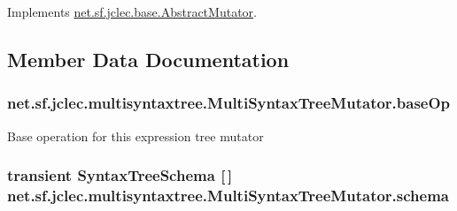 Implements \hyperlink{classnet_1_1sf_1_1jclec_1_1base_1_1_abstract_mutator_ad12e6a2be8fb6082255ce8f399c9b166}{net.\-sf.\-jclec.\-base.\-Abstract\-Mutator}.



\subsection{Member Data Documentation}
\hypertarget{classnet_1_1sf_1_1jclec_1_1multisyntaxtree_1_1_multi_syntax_tree_mutator_a80f98be790fb43998e0937ad1bbf4ec4}{
\subsubsection[{base\-Op}]{ net.\-sf.\-jclec.\-multisyntaxtree.\-Multi\-Syntax\-Tree\-Mutator.\-base\-Op\hspace{0.3cm}{\ttfamily [protected]}}}\label{classnet_1_1sf_1_1jclec_1_1multisyntaxtree_1_1_multi_syntax_tree_mutator_a80f98be790fb43998e0937ad1bbf4ec4}
Base operation for this expression tree mutator \hypertarget{classnet_1_1sf_1_1jclec_1_1multisyntaxtree_1_1_multi_syntax_tree_mutator_ac6c7570c521c38b33d6279906c1101cf}{
\subsubsection[{schema}]{\setlength{\rightskip}{0pt plus 5cm}transient {\bf Syntax\-Tree\-Schema} \mbox{[}$\,$\mbox{]} net.\-sf.\-jclec.\-multisyntaxtree.\-Multi\-Syntax\-Tree\-Mutator.\-schema\hspace{0.3cm}{\ttfamily [protected]}}}\label{classnet_1_1sf_1_1jclec_1_1multisyntaxtree_1_1_multi_syntax_tree_mutator_ac6c7570c521c38b33d6279906c1101cf}
